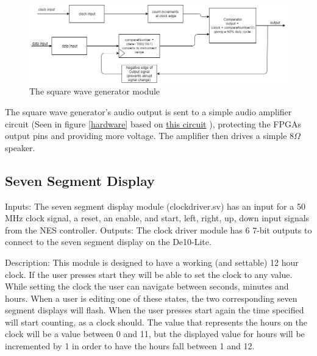 \documentclass[a4paper]{article}
\begin{document}
\begin{figure}[H]
    \includegraphics[width=0.8 \linewidth]{images/sqwave.JPG}
    \caption{The square wave generator module}
    \label{sqwave}
\end{figure}

The square wave generator's audio output is sent to a simple audio amplifier circuit (Seen in figure \ref{hardware} based on \href{https://www.instructables.com/id/Tales-From-the-Chip-LM386-Audio-Amplifier/}{this circuit} ), protecting the FPGAs output pins and providing more voltage. The amplifier then drives a simple 8$\Omega$ speaker. 

\subsection{Seven Segment Display}
Inputs: The seven segment display module (clockdriver.sv) has an input for a 50 MHz clock signal, a reset, an enable, and start, left, right, up, down input signals from the NES controller.
Outputs: The clock driver module has 6 7-bit outputs to connect to the seven segment display on the De10-Lite.

Description: This module is designed to have a working (and settable) 12 hour clock. If the user presses start they will be able to set the clock to any value. While setting the clock the user can navigate between seconds, minutes and hours. When a user is editing one of these states, the two corresponding seven segment displays will flash. When the user presses start again the time specified will start counting, as a clock should. The value that represents the hours on the clock will be a value between 0 and 11, but the displayed value for hours will be incremented by 1 in order to have the hours fall between 1 and 12. 
\end{document}

